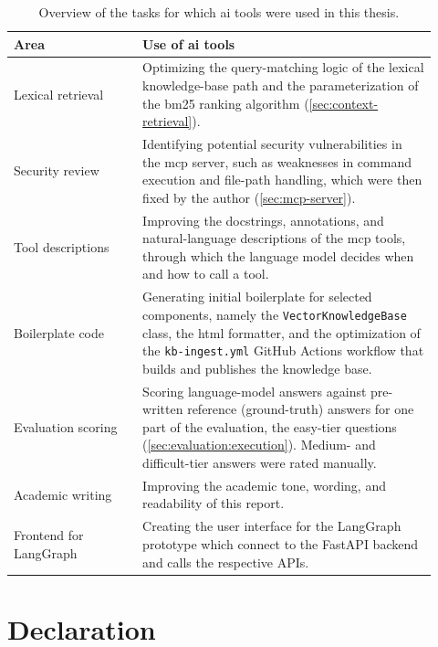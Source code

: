 \documentclass[
  numbers=noenddot,
  english,
  a4paper,
  twoside,
  bibliography=totoc,
  headsepline,
  cleardoublepage=empty,
  parskip=half,
  draft=false
]{scrbook}
\theoremstyle{break}
\renewcommand{\_}{\textunderscore\allowbreak}
\begin{document}
\begin{table}[htbp]
  \caption{Overview of the tasks for which \gls{ai} tools were used in this thesis.}
  \label{tab:ai-usage}
  \centering
  \small
  \begin{tabular}{p{0.28\linewidth}p{0.64\linewidth}}
    \toprule
    \textbf{Area} & \textbf{Use of \gls{ai} tools} \\
    \midrule
    Lexical retrieval
      & Optimizing the query-matching logic of the lexical knowledge-base path and the
        parameterization of the \gls{bm25} ranking algorithm
        (\cref{sec:context-retrieval}). \\
    Security review
      & Identifying potential security vulnerabilities in the \gls{mcp} server, such as
        weaknesses in command execution and file-path handling, which were then fixed by
        the author (\cref{sec:mcp-server}). \\
    Tool descriptions
      & Improving the docstrings, annotations, and natural-language descriptions of the
        \gls{mcp} tools, through which the language model decides when and how to call a
        tool. \\
    Boilerplate code
      & Generating initial boilerplate for selected components, namely the
        \texttt{VectorKnowledgeBase} class, the \gls{html} formatter, and the optimization
        of the \texttt{kb-ingest.yml} GitHub Actions workflow that builds and publishes the
        knowledge base. \\
    Evaluation scoring
      & Scoring language-model answers against pre-written reference (ground-truth)
        answers for one part of the evaluation, the easy-tier questions
        (\cref{sec:evaluation:execution}). Medium- and difficult-tier answers were rated
        manually. \\
    Academic writing
      & Improving the academic tone, wording, and readability of this report. \\
    Frontend for LangGraph
      & Creating the user interface for the LangGraph prototype which connect to the 
      FastAPI backend and calls the respective APIs. \\
    \bottomrule
  \end{tabular}
\end{table}


\clearpage
\pagestyle{empty}
\renewcommand*{\chapterpagestyle}{empty}

\chapter*{Declaration}
\end{document}
